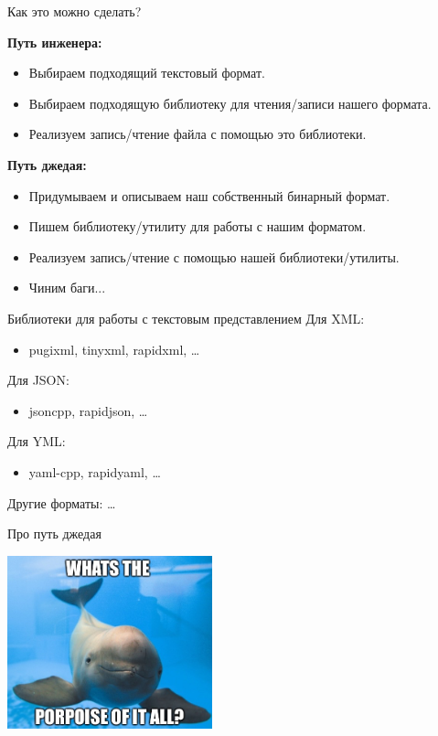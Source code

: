 \documentclass{beamer}
\begin{document}
\begin{frame}[fragile]{Как это можно сделать?}
    \begin{minipage}{.5\textwidth}
        {\bf Путь инженера:}
        \begin{itemize}
            \item Выбираем подходящий текстовый формат.
            \item Выбираем подходящую библиотеку для чтения/записи нашего формата.
            \item Реализуем запись/чтение файла с помощью это библиотеки.
        \end{itemize}
    \end{minipage}\hfill
    \begin{minipage}{.5\textwidth}
        {\bf Путь джедая:}
        \begin{itemize}
            \item Придумываем и описываем наш собственный бинарный формат.
            \item Пишем библиотеку/утилиту для работы с нашим форматом.
            \item Реализуем запись/чтение с помощью нашей библиотеки/утилиты.
            \item Чиним баги...
        \end{itemize}
    \end{minipage}
\end{frame}

\begin{frame}[fragile]{Библиотеки для работы с текстовым представлением}
    Для XML:
    \begin{itemize}
        \item pugixml, tinyxml, rapidxml, \dots
    \end{itemize}
    Для JSON:
    \begin{itemize}
        \item jsoncpp, rapidjson, \dots
    \end{itemize}
    Для YML:
    \begin{itemize}
        \item yaml-cpp, rapidyaml, \dots
    \end{itemize}
    Другие форматы: \dots
\end{frame}

\begin{frame}[fragile]{Про путь джедая}
    \begin{center}
        \includegraphics[height=50mm]{dolphin.jpg}
    \end{center}
\end{frame}
\end{document}
